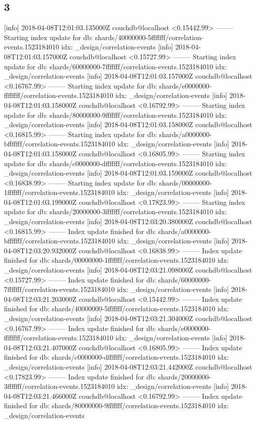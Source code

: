 \subsection{3}
[info] 2018-04-08T12:01:03.135000Z couchdb@localhost <0.15442.99> -------- Starting index update for db: shards/40000000-5fffffff/correlation-events.1523184010 idx: _design/correlation-events
[info] 2018-04-08T12:01:03.157000Z couchdb@localhost <0.15727.99> -------- Starting index update for db: shards/60000000-7fffffff/correlation-events.1523184010 idx: _design/correlation-events
[info] 2018-04-08T12:01:03.157000Z couchdb@localhost <0.16767.99> -------- Starting index update for db: shards/e0000000-ffffffff/correlation-events.1523184010 idx: _design/correlation-events
[info] 2018-04-08T12:01:03.158000Z couchdb@localhost <0.16792.99> -------- Starting index update for db: shards/80000000-9fffffff/correlation-events.1523184010 idx: _design/correlation-events
[info] 2018-04-08T12:01:03.158000Z couchdb@localhost <0.16815.99> -------- Starting index update for db: shards/a0000000-bfffffff/correlation-events.1523184010 idx: _design/correlation-events
[info] 2018-04-08T12:01:03.158000Z couchdb@localhost <0.16805.99> -------- Starting index update for db: shards/c0000000-dfffffff/correlation-events.1523184010 idx: _design/correlation-events
[info] 2018-04-08T12:01:03.159000Z couchdb@localhost <0.16838.99> -------- Starting index update for db: shards/00000000-1fffffff/correlation-events.1523184010 idx: _design/correlation-events
[info] 2018-04-08T12:01:03.199000Z couchdb@localhost <0.17823.99> -------- Starting index update for db: shards/20000000-3fffffff/correlation-events.1523184010 idx: _design/correlation-events
[info] 2018-04-08T12:03:20.380000Z couchdb@localhost <0.16815.99> -------- Index update finished for db: shards/a0000000-bfffffff/correlation-events.1523184010 idx: _design/correlation-events
[info] 2018-04-08T12:03:20.932000Z couchdb@localhost <0.16838.99> -------- Index update finished for db: shards/00000000-1fffffff/correlation-events.1523184010 idx: _design/correlation-events
[info] 2018-04-08T12:03:21.098000Z couchdb@localhost <0.15727.99> -------- Index update finished for db: shards/60000000-7fffffff/correlation-events.1523184010 idx: _design/correlation-events
[info] 2018-04-08T12:03:21.203000Z couchdb@localhost <0.15442.99> -------- Index update finished for db: shards/40000000-5fffffff/correlation-events.1523184010 idx: _design/correlation-events
[info] 2018-04-08T12:03:21.304000Z couchdb@localhost <0.16767.99> -------- Index update finished for db: shards/e0000000-ffffffff/correlation-events.1523184010 idx: _design/correlation-events
[info] 2018-04-08T12:03:21.407000Z couchdb@localhost <0.16805.99> -------- Index update finished for db: shards/c0000000-dfffffff/correlation-events.1523184010 idx: _design/correlation-events
[info] 2018-04-08T12:03:21.442000Z couchdb@localhost <0.17823.99> -------- Index update finished for db: shards/20000000-3fffffff/correlation-events.1523184010 idx: _design/correlation-events
[info] 2018-04-08T12:03:21.466000Z couchdb@localhost <0.16792.99> -------- Index update finished for db: shards/80000000-9fffffff/correlation-events.1523184010 idx: _design/correlation-events

